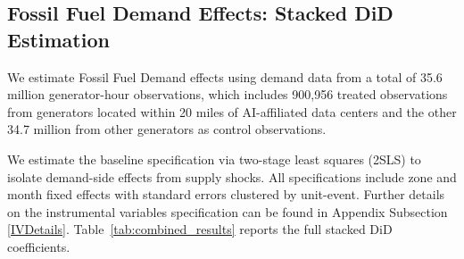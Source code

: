 \documentclass[sigconf]{acmart}
\newcommand{\nb}[1]{\textcolor{blue}{NB[#1]}}
\begin{document}




\subsection{Fossil Fuel Demand Effects: Stacked DiD Estimation}

We estimate Fossil Fuel Demand effects using demand data from a total of 35.6 million generator-hour observations, which includes 900,956 treated observations from generators located within 20 miles of AI-affiliated data centers and the other 34.7 million from other generators as control observations.

We estimate the baseline specification via two-stage least squares (2SLS) to isolate demand-side effects from supply shocks. All specifications include zone and month fixed effects with standard errors clustered by unit-event. Further details on the instrumental variables specification can be found in Appendix Subsection \ref{IVDetails}. Table~\ref{tab:combined_results} reports the full stacked DiD coefficients.
\end{document}
